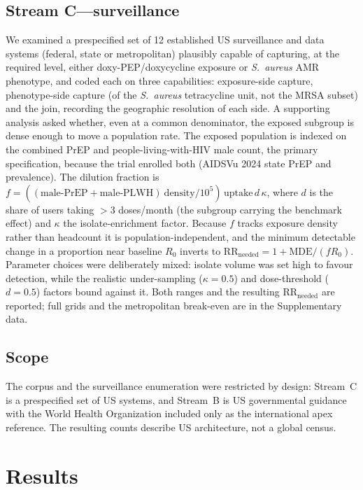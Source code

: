\documentclass[12pt,a4paper]{article}
\newcommand{\sa}{\emph{S.~aureus}}
\begin{document}
\subsection*{Stream C---surveillance}
We examined a prespecified set of 12 established US surveillance and data systems
(federal, state or metropolitan) plausibly capable of capturing, at the required
level, either doxy-PEP/doxycycline exposure or \sa{} AMR phenotype, and coded each
on three capabilities: exposure-side capture,
phenotype-side capture (of the \sa{} tetracycline unit, not the MRSA subset) and
the join, recording the geographic resolution of each side. A supporting analysis
asked whether, even at a common denominator, the exposed subgroup is dense enough
to move a population rate. The exposed population is indexed on the combined PrEP
and people-living-with-HIV male count, the primary specification, because the trial
enrolled both (AIDSVu 2024 state PrEP and prevalence). The dilution fraction is
$f=((\text{male-PrEP}+\text{male-PLWH})\ \text{density}/10^{5})\,\text{uptake}\,d\,\kappa$,
where $d$ is the share of users taking $>$3 doses/month (the subgroup carrying the
benchmark effect) and $\kappa$ the isolate-enrichment factor. Because $f$ tracks
exposure density rather than headcount it is population-independent, and the minimum
detectable change in a proportion near baseline $R_0$ inverts to
$\mathrm{RR_{needed}}=1+\mathrm{MDE}/(f R_0)$. Parameter choices were deliberately mixed: isolate volume was set high to favour detection, while the
realistic under-sampling ($\kappa=0.5$) and dose-threshold ($d=0.5$) factors bound
against it. Both ranges and the resulting $\mathrm{RR_{needed}}$ are reported;
full grids and the metropolitan break-even are in the Supplementary data.

\subsection*{Scope}
The corpus and the surveillance enumeration were restricted by design: Stream~C is
a prespecified set of US systems, and Stream~B is US governmental guidance with the
World Health Organization included only as the international apex reference. The
resulting counts describe US architecture, not a global census.

\section*{Results}
\end{document}
